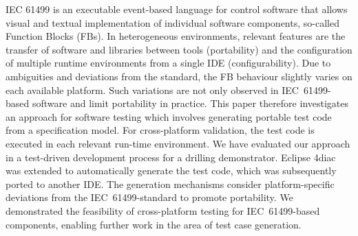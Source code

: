 IEC 61499 is an executable event-based language for control software that allows visual and textual implementation of individual software components, so-called Function Blocks (FBs). In heterogeneous environments, relevant features are the transfer of software and libraries between tools (portability) and the configuration of multiple runtime environments from a single IDE (configurability). Due to ambiguities and deviations from the standard, the FB behaviour slightly varies on each available platform. Such variations are not only observed in IEC~61499-based software and limit portability in practice. This paper therefore investigates an approach for software testing which involves generating portable test code from a specification model. For cross-platform validation, the test code is executed in each relevant run-time environment. We have evaluated our approach in a test-driven development process for a drilling demonstrator. Eclipse 4diac was extended to automatically generate the test code, which was subsequently ported to another IDE. The generation mechanisms consider platform-specific deviations from the IEC~61499-standard to promote portability. We demonstrated the feasibility of cross-platform testing for IEC~61499-based components, enabling further work in the area of test case generation.


\begin{comment}
Hence, executing FB tests in the target platform helps validate the correct functionality of an FB. %
Interface models in IEC 61499 specify the expected input/output behaviour of a component. A test execution framework can use this information for model-based testing, but these tests are currently not portable. %
In this paper, we use the modelled tests to automatically generate a platform-independent test application that allows validating the functionality of an FB on various platforms. The test automation helps detect any relevant variations in execution behavior among platforms. 
The test application that is executable on any IEC 61499-compliant platform and automatically compares the results obtained from the FB under test with the expected results. After generation, the test code is fully compliant with the IEC~61499-standard and does not rely on any tool-specific extensions. Hence, it can be ported between platforms. We have evaluated our approach using a test suite as well as a set of FBs that control a demonstrator. We used two IEC~61499 platforms, Eclipse 4diac and SE EcoStruxure, to evaluate the portability of the generated test application. The generation approach takes into account any platform-specific deviations from the IEC~61499-standard. In order to further promote portability between platforms, we also list deviations from the IEC standard for each platform.
\end{comment}